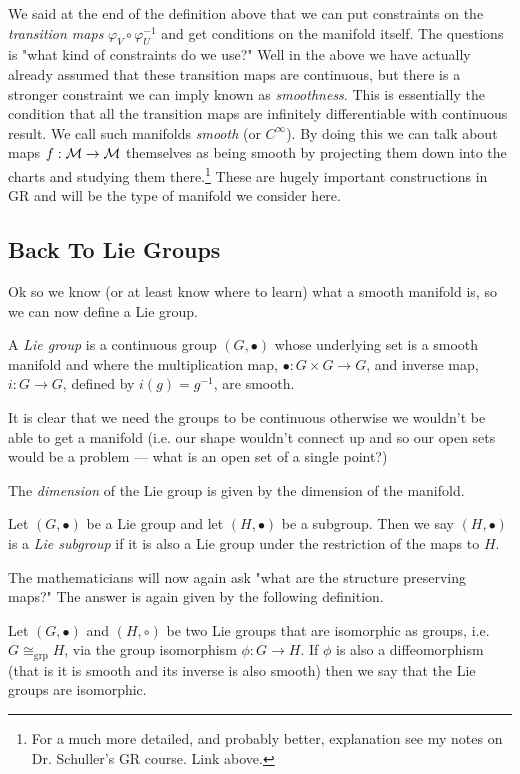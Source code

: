 We said at the end of the definition above that we can put constraints on the \textit{transition maps} $\varphi_V\circ \varphi_U^{-1}$ and get conditions on the manifold itself. The questions is "what kind of constraints do we use?" Well in the above we have actually already assumed that these transition maps are continuous, but there is a stronger constraint we can imply known as \textit{smoothness}. This is essentially the condition that all the transition maps are infinitely differentiable with continuous result. We call such manifolds \textit{smooth} (or $C^{\infty}$). By doing this we can talk about maps $f : \mathcal{M} \to \mathcal{M}$ themselves as being smooth by projecting them down into the charts and studying them there.\footnote{For a much more detailed, and probably better, explanation see my notes on Dr. Schuller's GR course. Link above.} These are hugely important constructions in GR and will be the type of manifold we consider here. 

\subsection{Back To Lie Groups}

Ok so we know (or at least know where to learn) what a smooth manifold is, so we can now define a Lie group. 

    A \textit{Lie group} is a continuous group $(G,\bullet)$ whose underlying set is a smooth manifold and where the multiplication map, $\bullet :  G \times G \to G$, and inverse map, $i : G \to G$, defined by $i(g) = g^{-1}$, are smooth. 
\ed 

It is clear that we need the groups to be continuous otherwise we wouldn't be able to get a manifold (i.e. our shape wouldn't connect up and so our open sets would be a problem --- what is an open set of a single point?)

    The \textit{dimension} of the Lie group is given by the dimension of the manifold.
\ed 

    Let $(G,\bullet)$ be a Lie group and let $(H,\bullet)$ be a subgroup. Then we say $(H,\bullet)$ is a \textit{Lie subgroup} if it is also a Lie group under the restriction of the maps to $H$.
\ed 

The mathematicians will now again ask "what are the structure preserving maps?" The answer is again given by the following definition.

    Let $(G,\bullet)$ and $(H,\circ)$ be two Lie groups that are isomorphic as groups, i.e. $G\cong_{\text{grp}}H$, via the group isomorphism $\phi:G\to H$. If $\phi$ is also a diffeomorphism (that is it is smooth and its inverse is also smooth) then we say that the Lie groups are isomorphic.  
\ed 

